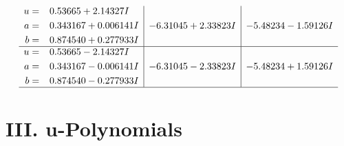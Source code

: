\documentclass[1p]{elsarticle_modified}
\theoremstyle{definition}
\begin{document}
$$\begin{array}{c|c|c}
\begin{aligned}
u &= \phantom{-}0.53665 + 2.14327 I \\
a &= \phantom{-}0.343167 + 0.006141 I \\
b &= \phantom{-}0.874540 + 0.277933 I\end{aligned}
 & -6.31045 + 2.33823 I & -5.48234 - 1.59126 I \\ \hline\begin{aligned}
u &= \phantom{-}0.53665 - 2.14327 I \\
a &= \phantom{-}0.343167 - 0.006141 I \\
b &= \phantom{-}0.874540 - 0.277933 I\end{aligned}
 & -6.31045 - 2.33823 I & -5.48234 + 1.59126 I\\
 \hline 
 \end{array}$$\newpage
\newpage\renewcommand{\arraystretch}{1}
\centering \section*{ III. u-Polynomials}
\end{document}
